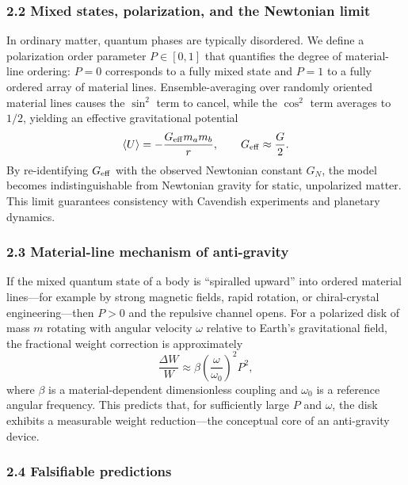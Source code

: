\documentclass[12pt,a4paper]{article}
\begin{document}
\subsubsection*{2.2 Mixed states, polarization, and the Newtonian limit}

In ordinary matter, quantum phases are typically disordered. We define a polarization order parameter $P\in[0,1]$ that quantifies the degree of material-line ordering: $P=0$ corresponds to a fully mixed state and $P=1$ to a fully ordered array of material lines. Ensemble-averaging over randomly oriented material lines causes the $\sin^2$ term to cancel, while the $\cos^2$ term averages to $1/2$, yielding an effective gravitational potential
\begin{equation}
\langle U\rangle = -\frac{G_{\rm eff}m_a m_b}{r}, \qquad G_{\rm eff}\approx \frac{G}{2}.
\end{equation}
By re-identifying $G_{\rm eff}$ with the observed Newtonian constant $G_N$, the model becomes indistinguishable from Newtonian gravity for static, unpolarized matter. This limit guarantees consistency with Cavendish experiments and planetary dynamics.

\subsubsection*{2.3 Material-line mechanism of anti-gravity}

If the mixed quantum state of a body is ``spiralled upward'' into ordered material lines---for example by strong magnetic fields, rapid rotation, or chiral-crystal engineering---then $P>0$ and the repulsive channel opens. For a polarized disk of mass $m$ rotating with angular velocity $\omega$ relative to Earth's gravitational field, the fractional weight correction is approximately
\begin{equation}
\frac{\Delta W}{W} \approx \beta\left(\frac{\omega}{\omega_0}\right)^2 P^2,
\end{equation}
where $\beta$ is a material-dependent dimensionless coupling and $\omega_0$ is a reference angular frequency. This predicts that, for sufficiently large $P$ and $\omega$, the disk exhibits a measurable weight reduction---the conceptual core of an anti-gravity device.

\subsubsection*{2.4 Falsifiable predictions}
\end{document}

